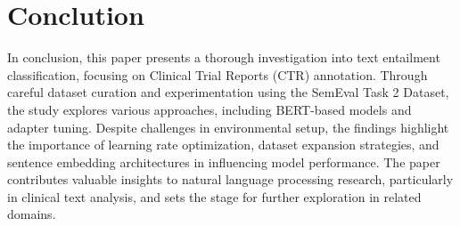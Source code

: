 \section{Conclution}

In conclusion, this paper presents a thorough investigation into text entailment classification, 
focusing on Clinical Trial Reports (CTR) annotation. Through careful dataset curation and 
experimentation using the SemEval Task 2 Dataset, the study explores various approaches, 
including BERT-based models and adapter tuning. Despite challenges in environmental setup, 
the findings highlight the importance of learning rate optimization, dataset expansion 
strategies, and sentence embedding architectures in influencing model performance. 
The paper contributes valuable insights to natural language processing research, 
particularly in clinical text analysis, and sets the stage for further exploration 
in related domains.